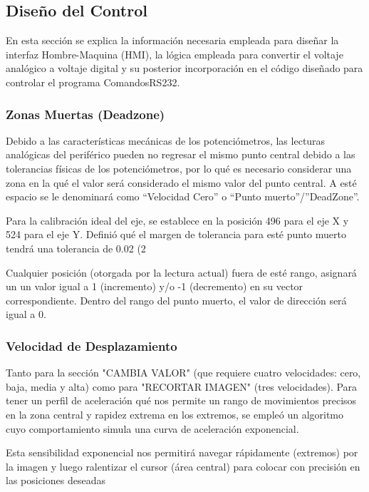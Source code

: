 \documentclass[conference]{IEEEtran}
\begin{document}
    \subsection{Diseño del Control}
    En esta sección se explica la información necesaria empleada para diseñar la interfaz Hombre-Maquina (HMI), la lógica empleada para convertir el voltaje analógico a voltaje digital y su posterior incorporación en el código diseñado para controlar el programa ComandosRS232.

    \subsubsection{Zonas Muertas (Deadzone)}
    Debido a las características mecánicas de los potenciómetros, las lecturas analógicas del periférico pueden no regresar el mismo punto central debido a las tolerancias físicas de los potenciómetros, por lo qué es necesario considerar una zona en la qué el valor será considerado el mismo valor del punto central. A esté espacio se le denominará como “Velocidad Cero” o “Punto muerto”/”DeadZone”.

    Para la calibración ideal del eje, se establece en la posición 496 para el eje X y 524 para el eje Y. Definió qué el margen de tolerancia para esté punto muerto tendrá una tolerancia de 0.02 (2%

    Cualquier posición (otorgada por la lectura actual) fuera de esté rango, asignará un un valor igual a 1 (incremento) y/o -1 (decremento) en su vector correspondiente. Dentro del rango del punto muerto, el valor de dirección será igual a 0.

    \subsubsection{Velocidad de Desplazamiento}
    Tanto para la sección "CAMBIA VALOR" (que requiere cuatro velocidades: cero, baja, media y alta) como para "RECORTAR IMAGEN" (tres velocidades). Para tener un perfil de aceleración qué nos permite un rango de movimientos precisos en la zona central y rapidez extrema en los extremos, se empleó un algoritmo cuyo comportamiento simula una curva de aceleración exponencial.

    Esta sensibilidad exponencial nos permitirá navegar rápidamente (extremos) por la imagen y luego ralentizar el cursor (área central) para colocar con precisión en las posiciones deseadas 
\end{document}
